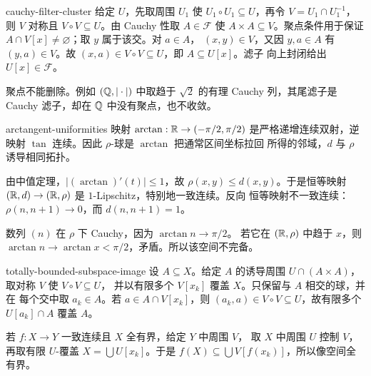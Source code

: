 \begin{solution}{cauchy-filter-cluster}
给定 \(U\)，先取周围 \(U_1\) 使
\(U_1\circ U_1\subseteq U\)，再令 \(V=U_1\cap U_1^{-1}\)，则
\(V\) 对称且 \(V\circ V\subseteq U\)。由 Cauchy 性取
\(A\in\mathcal F\) 使 \(A\times A\subseteq V\)。聚点条件用于保证
\(A\cap V[x]\ne\varnothing\)；取 \(y\) 属于该交。对 \(a\in A\)，
\((x,y)\in V\)，又因 \(y,a\in A\) 有 \((y,a)\in V\)。故
\((x,a)\in V\circ V\subseteq U\)，即 \(A\subseteq U[x]\)。滤子
向上封闭给出 \(U[x]\in\mathcal F\)。

聚点不能删除。例如 \((\mathbb{Q},|\cdot|)\) 中取趋于 \(\sqrt2\) 的有理
Cauchy 列，其尾滤子是 Cauchy 滤子，却在 \(\mathbb{Q}\) 中没有聚点，也不收敛。
\end{solution}

\begin{solution}{arctangent-uniformities}
映射 \(\arctan:\mathbb{R}\to(-\pi/2,\pi/2)\) 是严格递增连续双射，逆映射
\(\tan\) 连续。因此 \(\rho\)-球是 \(\arctan\) 把通常区间坐标拉回
所得的邻域，\(d\) 与 \(\rho\) 诱导相同拓扑。

由中值定理，\(|(\arctan)'(t)|\le1\)，故
\(\rho(x,y)\le d(x,y)\)。于是恒等映射
\((\mathbb{R},d)\to(\mathbb{R},\rho)\) 是 \(1\)-Lipschitz，特别地一致连续。反向
恒等映射不一致连续：\(\rho(n,n+1)\to0\)，而 \(d(n,n+1)=1\)。

数列 \((n)\) 在 \(\rho\) 下 Cauchy，因为 \(\arctan n\to\pi/2\)。
若它在 \((\mathbb{R},\rho)\) 中趋于 \(x\)，则
\(\arctan n\to\arctan x<\pi/2\)，矛盾。所以该空间不完备。
\end{solution}

\begin{solution}{totally-bounded-subspace-image}
设 \(A\subseteq X\)。给定 \(A\) 的诱导周围
\(U\cap(A\times A)\)，取对称 \(V\) 使 \(V\circ V\subseteq U\)，
并以有限多个 \(V[x_k]\) 覆盖 \(X\)。只保留与 \(A\) 相交的球，并在
每个交中取 \(a_k\in A\)。若 \(a\in A\cap V[x_k]\)，则
\((a_k,a)\in V\circ V\subseteq U\)，故有限多个 \(U[a_k]\cap A\)
覆盖 \(A\)。

若 \(f:X\to Y\) 一致连续且 \(X\) 全有界，给定 \(Y\) 中周围 \(V\)，
取 \(X\) 中周围 \(U\) 控制 \(V\)，再取有限 \(U\)-覆盖
\(X=\bigcup U[x_k]\)。于是
\(f(X)\subseteq\bigcup V[f(x_k)]\)，所以像空间全有界。
\end{solution}

